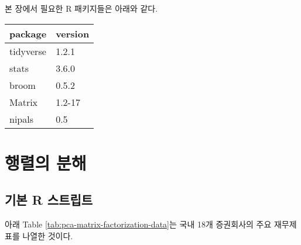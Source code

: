 \documentclass[]{book}
\begin{document}
본 장에서 필요한 R 패키지들은 아래와 같다.

\begin{tabular}{l|l}
\hline
package & version\\
\hline
tidyverse & 1.2.1\\
\hline
stats & 3.6.0\\
\hline
broom & 0.5.2\\
\hline
Matrix & 1.2-17\\
\hline
nipals & 0.5\\
\hline
\end{tabular}

\hypertarget{pca-matrix-factorization}{%
\section{행렬의 분해}\label{pca-matrix-factorization}}

\hypertarget{pca-matrix-factorization-basic-script}{%
\subsection{기본 R 스트립트}\label{pca-matrix-factorization-basic-script}}

아래 Table \ref{tab:pca-matrix-factorization-data}는 국내 18개 증권회사의 주요 재무제표를 나열한 것이다.
\end{document}
